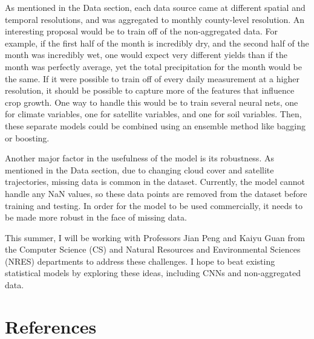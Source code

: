 \documentclass[letterpaper]{article}
\begin{document}
As mentioned in the Data section, each data source came at different spatial and temporal resolutions, and was aggregated to monthly county-level resolution. An interesting proposal would be to train off of the non-aggregated data. For example, if the first half of the month is incredibly dry, and the second half of the month was incredibly wet, one would expect very different yields than if the month was perfectly average, yet the total precipitation for the month would be the same. If it were possible to train off of every daily measurement at a higher resolution, it should be possible to capture more of the features that influence crop growth. One way to handle this would be to train several neural nets, one for climate variables, one for satellite variables, and one for soil variables. Then, these separate models could be combined using an ensemble method like bagging or boosting.

Another major factor in the usefulness of the model is its robustness. As mentioned in the Data section, due to changing cloud cover and satellite trajectories, missing data is common in the dataset. Currently, the model cannot handle any NaN values, so these data points are removed from the dataset before training and testing. In order for the model to be used commercially, it needs to be made more robust in the face of missing data.

This summer, I will be working with Professors Jian Peng and Kaiyu Guan from the Computer Science (CS) and Natural Resources and Environmental Sciences (NRES) departments to address these challenges. I hope to beat existing statistical models by exploring these ideas, including CNNs and non-aggregated data.

\section{References}
\end{document}
